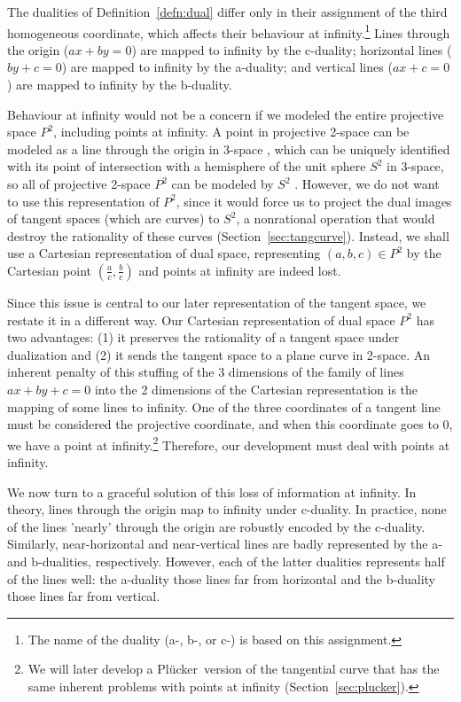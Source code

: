 \documentclass[12pt]{article}
\newcommand{\plucker}{Pl\"{u}cker\ }
\begin{document}
The dualities of Definition~\ref{defn:dual} 
differ only in their assignment of the third homogeneous coordinate,
which affects their behaviour at infinity.\footnote{The
	name of the duality (a-, b-, or c-) is based on this assignment.}
Lines through the origin ($ax+by=0$) are mapped to infinity by the c-duality;
horizontal lines ($by+c=0$) are mapped to infinity by the a-duality;
and vertical lines ($ax+c=0$) are mapped to infinity by the b-duality.

Behaviour at infinity would not be a concern if we modeled
the entire projective space $P^2$, including points at infinity.
A point in projective 2-space can be modeled as a line through the
origin in 3-space \cite{foley96}, which can be uniquely identified with its
point of intersection with a hemisphere of the unit sphere $S^2$ in 3-space,
so all of projective 2-space $P^2$ can be modeled by $S^2$ \cite{zorin00}.
However, we do not want to use this representation of $P^2$,
since it would force us to project 
the dual images of tangent spaces (which are curves)
to $S^2$, a nonrational operation that would destroy the rationality
of these curves (Section~\ref{sec:tangcurve}).
Instead, we shall use a Cartesian representation of dual space, 
representing $(a,b,c) \in P^2$ by the Cartesian point $(\frac{a}{c},\frac{b}{c})$
and points at infinity are indeed lost.

Since this issue is central to our later representation
of the tangent space, we restate it in a different way.
Our Cartesian representation of dual space $P^2$ has two advantages:
(1) it preserves the rationality of a tangent space under dualization and
(2) it sends the tangent space to a plane curve in 2-space.
An inherent penalty of this
stuffing of the 3 dimensions of the family of lines $ax+by+c=0$
into the 2 dimensions of the Cartesian representation
is the mapping of some lines to infinity.
One of the three coordinates of a tangent line must be considered the 
projective coordinate, and
when this coordinate goes to 0, we have a point at infinity.\footnote{We
	will later develop a \plucker version of the 
	tangential curve that has the same inherent problems with points at infinity 
	(Section~\ref{sec:plucker}).}
Therefore, our development must deal with points at infinity.

We now turn to a graceful solution of this loss of information at infinity.
In theory, lines through the origin map to infinity under c-duality.
In practice, none of the lines 'nearly' through the origin 
are robustly encoded by the c-duality.
Similarly, near-horizontal and near-vertical lines 
are badly represented by the a- and b-dualities, respectively.
However, each of the latter dualities represents half of the lines well:
the a-duality those lines far from horizontal and
the b-duality those lines far from vertical.
\end{document}
